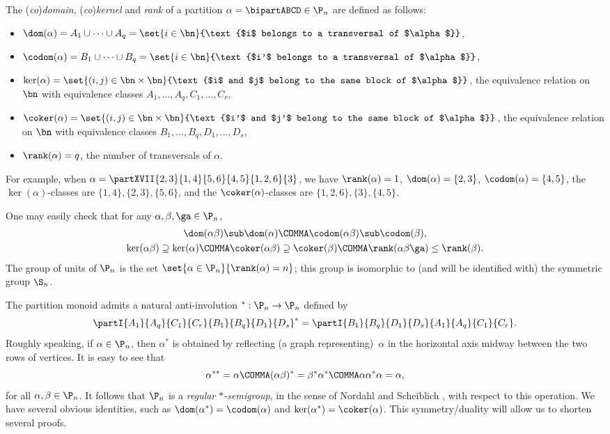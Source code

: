 The (\emph{co})\emph{domain}, (\emph{co})\emph{kernel} and \emph{rank} of a partition $\alpha=\bipartABCD\in\P_n$ are defined as follows:~
\begin{itemize}
\item
$\dom(\alpha) =A_1\cup\dots\cup A_q= \set{i\in\bn}{\text{$i$ belongs to a transversal of $\alpha$}}$,
\item
$\codom(\alpha) =B_1\cup\dots\cup B_q =\set{i\in\bn}{\text{$i'$ belongs to a transversal of $\alpha$}}$,
\item
$\ker(\alpha) = \set{(i,j)\in\bn\times\bn}{\text{$i$ and $j$ belong to the same block of $\alpha$}}$,
the equivalence relation on $\bn$ with equivalence classes $A_1,\dots, A_q,C_1, \dots, C_r$,
\item
$\coker(\alpha) = \set{(i,j)\in\bn\times\bn}{\text{$i'$ and $j'$ belong to the same block of $\alpha$}}$,
the equivalence relation on $\bn$ with equivalence classes $B_1,\dots, B_q,D_1, \dots, D_s$,
\item
$\rank(\alpha)=q$, the number of transversals of $\alpha$.
\end{itemize}
For example, when $\alpha = \partXVII{2,3}{1,4}{5,6}{4,5}{1,2,6}{3}$, we have
$\rank(\alpha)=1$, $\dom(\alpha)=\{2,3\}$, $\codom(\alpha)=\{4,5\}$, the $\ker(\alpha)$-classes are $\{1,4\},\{2,3\},\{5,6\}$, and the $\coker(\alpha)$-classes are $\{1,2,6\},\{3\},\{4,5\}$.


One may easily check that for any $\alpha,\beta,\ga\in\P_n$,
\begin{gather*}
\dom(\alpha\beta)\sub\dom(\alpha) \COMMA \codom(\alpha\beta)\sub\codom(\beta) , \\
\ker(\alpha\beta)\supseteq\ker(\alpha) \COMMA \coker(\alpha\beta)\supseteq\coker(\beta) \COMMA
\rank(\alpha\beta\ga)\leq\rank(\beta).
\end{gather*}
The group of units of $\P_n$ is the set $\set{\alpha\in\P_n}{\rank(\alpha)=n}$; this
group is isomorphic to (and will be identified with) the symmetric group $\S_n$.

The partition monoid
admits a natural anti-involution ${}^*:\P_n\to\P_n$ defined by 
\[
\partI{A_1}{A_q}{C_1}{C_r}{B_1}{B_q}{D_1}{D_s}^*=\partI{B_1}{B_q}{D_1}{D_s}{A_1}{A_q}{C_1}{C_r}.
\]
Roughly speaking, if $\alpha\in\P_n$, then $\alpha^*$ is obtained by reflecting (a graph representing)~$\alpha$ in the horizontal axis midway between the two rows of vertices.  It is easy to see that
\[
\alpha^{**}=\alpha \COMMA (\alpha\beta)^*=\beta^*\alpha^* \COMMA \alpha\alpha^*\alpha=\alpha,
\]
for all $\alpha,\beta\in\P_n$.  It follows that $\P_n$ is a \emph{regular $*$-semigroup}, in the sense of Nordahl and Scheiblich \cite{NS1978}, with respect to this operation.  
We have several obvious identities, such as $\dom(\alpha^*)=\codom(\alpha)$ and $\ker(\alpha^*)=\coker(\alpha)$. 
This symmetry/duality will allow us to shorten several proofs.


